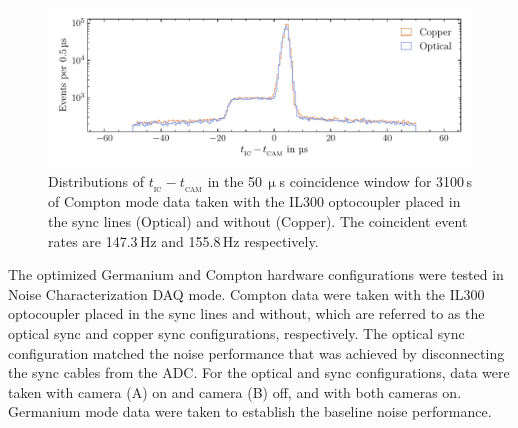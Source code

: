\begin{figure}[htb]
    \centering
	\vspace*{-10pt}
    \includegraphics[width=6in]{figs/param/coincidence_window_6_9in.pdf}
	\vspace*{-10mm}
    \caption{ Distributions of $t_{_{\text{IC}}} - t_{_{\text{CAM}}}$ in the 50\,$\upmu$s coincidence window for 3100\,s of Compton mode data taken with the IL300 optocoupler placed in the sync lines (Optical) and without (Copper). The coincident event rates are 147.3\,Hz and 155.8\,Hz respectively.}
    \label{fig:coincidence_window}
	\vspace*{-5pt}
\end{figure}

The optimized Germanium and Compton hardware configurations were tested in Noise Characterization DAQ mode. Compton data were taken with the IL300 optocoupler placed in the sync lines and without, which are referred to as the optical sync and copper sync configurations, respectively. The optical sync configuration matched the noise performance that was achieved by disconnecting the sync cables from the ADC. For the optical and sync configurations, data were taken with camera (A) on and camera (B) off, and with both cameras on. Germanium mode data were taken to establish the baseline noise performance.  

